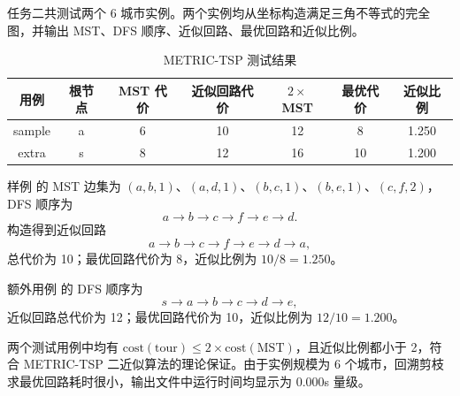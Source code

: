 \documentclass{sysucseexp}
\begin{document}
任务二共测试两个 6 城市实例。两个实例均从坐标构造满足三角不等式的完全图，并输出 MST、DFS 顺序、近似回路、最优回路和近似比例。

\begin{table}[htbp]
  \centering
  \caption{METRIC-TSP 测试结果}
  \begin{tabular}{ccccccc}
    \toprule
    用例 & 根节点 & MST 代价 & 近似回路代价 & $2\times$MST & 最优代价 & 近似比例 \\
    \midrule
    sample & a & 6 & 10 & 12 & 8  & 1.250 \\
    extra  & s & 8 & 12 & 16 & 10 & 1.200 \\
    \bottomrule
  \end{tabular}
\end{table}

样例  的 MST 边集为 $(a,b,1)$、$(a,d,1)$、$(b,c,1)$、$(b,e,1)$、$(c,f,2)$，DFS 顺序为
\[
  a \rightarrow b \rightarrow c \rightarrow f \rightarrow e \rightarrow d .
\]
构造得到近似回路
\[
  a \rightarrow b \rightarrow c \rightarrow f \rightarrow e \rightarrow d \rightarrow a,
\]
总代价为 10；最优回路代价为 8，近似比例为 $10/8=1.250$。

额外用例  的 DFS 顺序为
\[
  s \rightarrow a \rightarrow b \rightarrow c \rightarrow d \rightarrow e,
\]
近似回路总代价为 12；最优回路代价为 10，近似比例为 $12/10=1.200$。

两个测试用例中均有 $\mathrm{cost(tour)}\leq 2\times\mathrm{cost(MST)}$，且近似比例都小于 2，符合 METRIC-TSP 二近似算法的理论保证。由于实例规模为 6 个城市，回溯剪枝求最优回路耗时很小，输出文件中运行时间均显示为 0.000s 量级。
\end{document}
